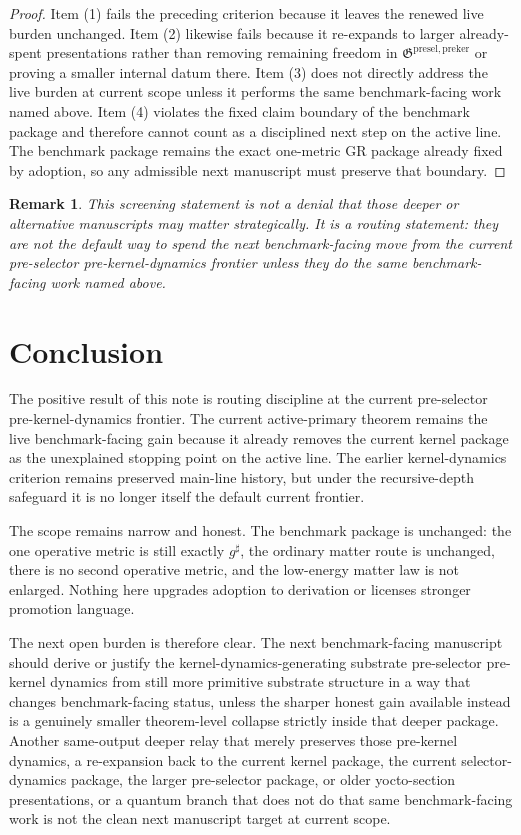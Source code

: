 \documentclass[11pt]{article}
\newcommand{\CompletedMetric}{g^{\sharp}}
\newcommand{\PreKernelPackage}{\mathfrak G^{\mathrm{presel,preker}}}
\newtheorem{remark}{Remark}
\begin{document}
\begin{proof}
Item (1) fails the preceding criterion because it leaves the renewed live burden unchanged. Item (2) likewise fails because it re-expands to larger already-spent presentations rather than removing remaining freedom in \(\PreKernelPackage\) or proving a smaller internal datum there. Item (3) does not directly address the live burden at current scope unless it performs the same benchmark-facing work named above. Item (4) violates the fixed claim boundary of the benchmark package and therefore cannot count as a disciplined next step on the active line. The benchmark package remains the exact one-metric GR package already fixed by adoption, so any admissible next manuscript must preserve that boundary.
\end{proof}

\begin{remark}
This screening statement is not a denial that those deeper or alternative manuscripts may matter strategically. It is a routing statement: they are not the default way to spend the next benchmark-facing move from the current pre-selector pre-kernel-dynamics frontier unless they do the same benchmark-facing work named above.
\end{remark}

\section{Conclusion}

The positive result of this note is routing discipline at the current pre-selector pre-kernel-dynamics frontier. The current active-primary theorem remains the live benchmark-facing gain because it already removes the current kernel package as the unexplained stopping point on the active line. The earlier kernel-dynamics criterion remains preserved main-line history, but under the recursive-depth safeguard it is no longer itself the default current frontier.

The scope remains narrow and honest. The benchmark package is unchanged: the one operative metric is still exactly \(\CompletedMetric\), the ordinary matter route is unchanged, there is no second operative metric, and the low-energy matter law is not enlarged. Nothing here upgrades adoption to derivation or licenses stronger promotion language.

The next open burden is therefore clear. The next benchmark-facing manuscript should derive or justify the kernel-dynamics-generating substrate pre-selector pre-kernel dynamics from still more primitive substrate structure in a way that changes benchmark-facing status, unless the sharper honest gain available instead is a genuinely smaller theorem-level collapse strictly inside that deeper package. Another same-output deeper relay that merely preserves those pre-kernel dynamics, a re-expansion back to the current kernel package, the current selector-dynamics package, the larger pre-selector package, or older yocto-section presentations, or a quantum branch that does not do that same benchmark-facing work is not the clean next manuscript target at current scope.
\end{document}
